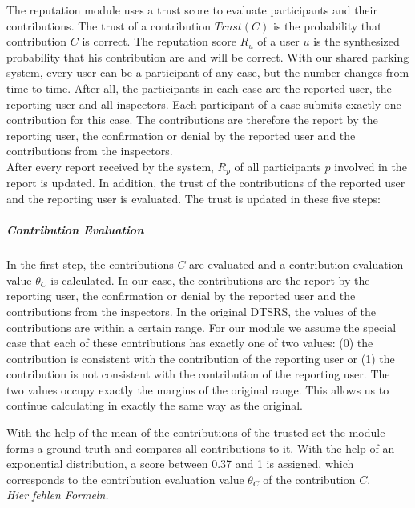 \documentclass[
a4paper,     %
titlepage,   %
14pt         %
]{scrartcl}  %
\theoremstyle{mystyle}
\begin{document}
The reputation module uses a trust score to evaluate participants and their contributions. The trust of a contribution $Trust(C)$ is the probability that contribution $C$ is correct. The reputation score $R_u$ of a user $u$ is the synthesized probability that his contribution are and will be correct. With our shared parking system, every user can be a participant of any case, but the number changes from time to time. After all, the participants in each case are the reported user, the reporting user and all inspectors. Each participant of a case submits exactly one contribution for this case. The contributions are therefore the report by the reporting user, the confirmation or denial by the reported user and the contributions from the inspectors.\\

After every report received by the system, $R_p$ of all participants $p$ involved in the report is updated. In addition, the trust of the contributions of the reported user and the reporting user is evaluated. The trust is updated in these five steps:

\subparagraph{Contribution Evaluation}In the first step, the contributions $C$ are evaluated and a contribution evaluation value $\theta_C $ is calculated. In our case, the contributions are the report by the reporting user, the confirmation or denial by the reported user and the contributions from the inspectors. In the original DTSRS, the values of the contributions are within a certain range. For our module we assume the special case that each of these contributions has exactly one of two values: (0) the contribution is consistent with the contribution of the reporting user or (1) the contribution is not consistent with the contribution of the reporting user. The two values occupy exactly the margins of the original range. This allows us to continue calculating in exactly the same way as the original.

With the help of the mean of the contributions of the trusted set the module forms a ground truth and compares all contributions to it. With the help of an exponential distribution, a score between 0.37 and 1 is assigned, which corresponds to the contribution evaluation value $\theta_C $ of the contribution $C$.\\

\textit{Hier fehlen Formeln.}
\end{document}
